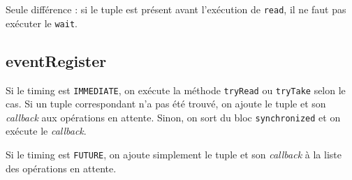 \documentclass[10pt, a4paper]{article}
\begin{document}
		Seule différence : si le tuple est présent avant l'exécution de \texttt{read}, il ne faut pas exécuter le \texttt{wait}.
		
	\subsection*{eventRegister}
		Si le timing est \texttt{IMMEDIATE}, on exécute la méthode \texttt{tryRead} ou \texttt{tryTake} selon le cas. Si un tuple correspondant n'a pas été trouvé, on ajoute le tuple et son \textit{callback} aux opérations en attente. Sinon, on sort du bloc \texttt{synchronized} et on exécute le \textit{callback}.
		
		Si le timing est \texttt{FUTURE}, on ajoute simplement le tuple et son \textit{callback} à la liste des opérations en attente.
	
\end{document}
